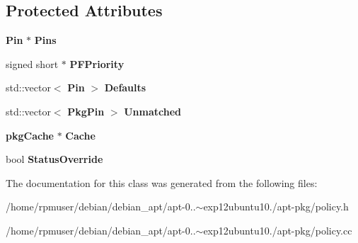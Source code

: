 \subsection*{\-Protected \-Attributes}
\begin{DoxyCompactItemize}
\item 
{\bf \-Pin} $\ast$ {\bfseries \-Pins}\label{classpkgPolicy_ab6e547b6c94c8b367dacd2641198822c}

\item 
signed short $\ast$ {\bfseries \-P\-F\-Priority}\label{classpkgPolicy_afa4b38370d0caa9db2e8573824943fbe}

\item 
std\-::vector$<$ {\bf \-Pin} $>$ {\bfseries \-Defaults}\label{classpkgPolicy_a2261f88b5cea770400db122518897cb1}

\item 
std\-::vector$<$ {\bf \-Pkg\-Pin} $>$ {\bfseries \-Unmatched}\label{classpkgPolicy_aea39fd6037d54b0feda46e49a35cfa23}

\item 
{\bf pkg\-Cache} $\ast$ {\bfseries \-Cache}\label{classpkgPolicy_a200f99ff6c297b73a2e9302d95ca7a87}

\item 
bool {\bfseries \-Status\-Override}\label{classpkgPolicy_ad3b12d92507111c100a4821e02f6a30c}

\end{DoxyCompactItemize}


\-The documentation for this class was generated from the following files\-:\begin{DoxyCompactItemize}
\item 
/home/rpmuser/debian/debian\-\_\-apt/apt-\/0..$\sim$exp12ubuntu10./apt-\/pkg/policy.\-h\item 
/home/rpmuser/debian/debian\-\_\-apt/apt-\/0..$\sim$exp12ubuntu10./apt-\/pkg/policy.\-cc\end{DoxyCompactItemize}
